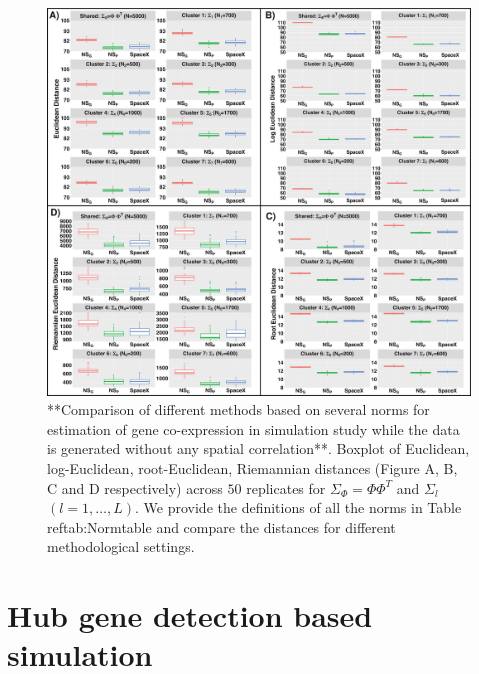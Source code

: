 \documentclass[
]{book}
\begin{document}
\begin{figure}

{\centering \includegraphics[width=143.36in]{images/Null_sim_norm} 

}

\caption{ **Comparison of different methods based on several norms for estimation of gene co-expression in simulation study while the data is generated without any spatial correlation**. Boxplot of Euclidean, log-Euclidean, root-Euclidean, Riemannian distances (Figure A, B, C and D respectively) across  $50$ replicates for $\Sigma_{\Phi} = \Phi \Phi^{T}$ and $\Sigma_{l}$ $(l = 1, \dots , L)$. We provide the definitions of all the norms in Table \\ref{tab:Normtable} and compare the distances for different methodological settings.}\label{fig:nullsimulationnorm}
\end{figure}

\hypertarget{hub-gene-detection-based-simulation}{%
\section{Hub gene detection based simulation}\label{hub-gene-detection-based-simulation}}
\end{document}
